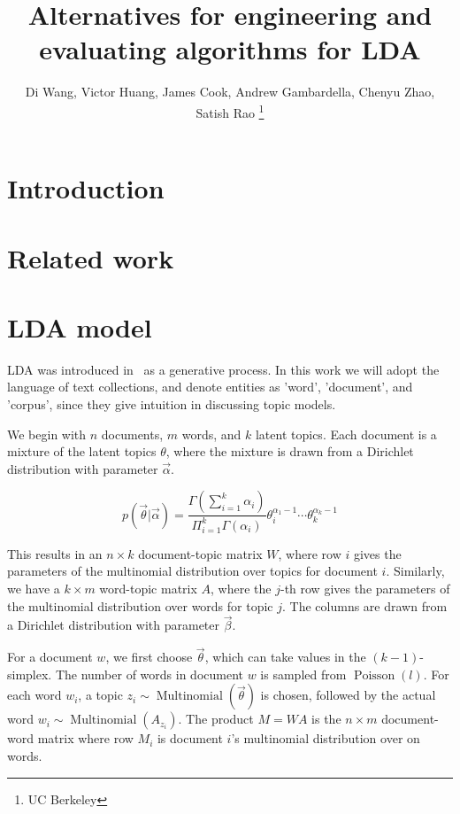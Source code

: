 \documentclass{sig-alternate}
\title{Alternatives for engineering and evaluating algorithms for LDA}
\author{Di Wang,  Victor Huang, James Cook, Andrew Gambardella,  Chenyu Zhao, Satish Rao
\thanks{UC Berkeley}
}
\date{}
\begin{document}
\maketitle

\begin{abstract}



\end{abstract}

\section{Introduction} \label{sec:intro}


\section{Related work}

\label{sec:related}

%
\section{LDA model} \label{sec:ldamodel}
LDA was introduced in~\cite{Blei2003a} as a generative process. In
this work we will adopt the language of text collections, and denote
entities as 'word', 'document', and 'corpus', since they give
intuition in discussing topic models.

We begin with $ n $ documents, $ m $ words, and $ k $ latent topics. Each
document is a mixture of the latent topics $ \theta $, where the mixture is
drawn from a Dirichlet distribution with parameter $\vec{\alpha}$. 

\[
p(\vec{\theta}|\vec{\alpha})=\frac{\Gamma(\sum_{i=1}^k\alpha_i)}{\Pi_{i=1}^k\Gamma(\alpha_i)}\theta_i^{\alpha_1-1}\cdots\theta_k^{\alpha_k-1}
\] 

This results in an $n\times k$ document-topic matrix $ W $, where row $ i $ gives the parameters of the multinomial
distribution over topics for document $ i $. Similarly, we have a $ k \times m $ word-topic matrix $A$,
where the $j$-th row gives the parameters of the multinomial distribution
over words for topic $j$. The columns are drawn from a Dirichlet distribution with parameter
$ \vec{\beta} $.

For a document $w$, we first choose $\vec{\theta}$, which can take values in the $(k-1)$-simplex.
The number of words in document $w$ is sampled from $\operatorname{Poisson}(l)$. For each word $w_i$, a
topic $z_i\sim \operatorname{Multinomial}(\vec{\theta})$ is chosen, followed by the actual
word $w_i\sim \operatorname{Multinomial}(A_{z_i})$. The product $M=WA$ is the $n\times m$
document-word matrix where row $M_i$ is document $i$'s multinomial distribution over
on words.
\end{document}
